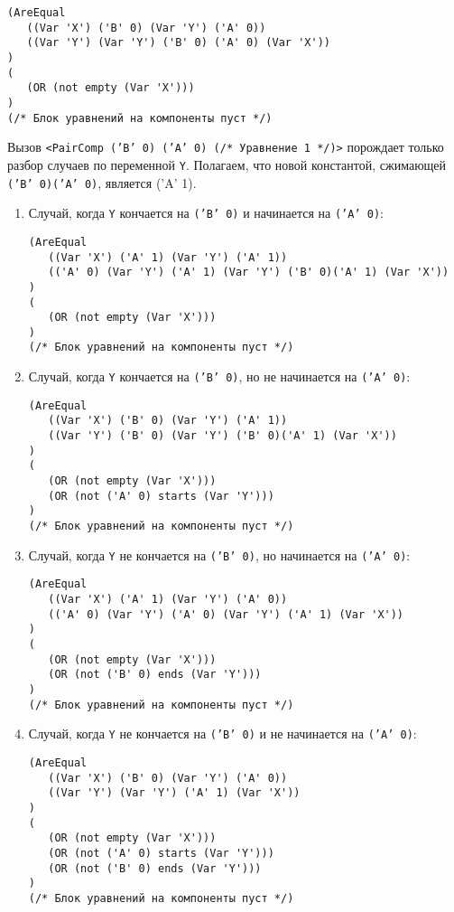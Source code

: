 \documentclass[12pt]{article}
\begin{document}
\begin{verbatim}
(AreEqual 
   ((Var 'X') ('B' 0) (Var 'Y') ('A' 0))
   ((Var 'Y') (Var 'Y') ('B' 0) ('A' 0) (Var 'X'))
)
(
   (OR (not empty (Var 'X')))
)
(/* Блок уравнений на компоненты пуст */)
\end{verbatim}
 
Вызов \texttt{<PairComp ('B' 0) ('A' 0) (/* Уравнение 1 */)>} порождает только разбор случаев по переменной \verb|Y|. Полагаем, что новой константой, сжимающей \texttt{('B' 0)('A' 0)}, является ('A' 1). 

\begin{enumerate}
\item Случай, когда \verb|Y| кончается на \texttt{('B' 0)} и начинается на \texttt{('A' 0)}:

\begin{verbatim}
(AreEqual 
   ((Var 'X') ('A' 1) (Var 'Y') ('A' 1))
   (('A' 0) (Var 'Y') ('A' 1) (Var 'Y') ('B' 0)('A' 1) (Var 'X'))
)
(
   (OR (not empty (Var 'X')))
)
(/* Блок уравнений на компоненты пуст */)
\end{verbatim}
 
\item Случай, когда \verb|Y| кончается на \texttt{('B' 0)}, но не начинается на \texttt{('A' 0)}:

\begin{verbatim}
(AreEqual 
   ((Var 'X') ('B' 0) (Var 'Y') ('A' 1))
   ((Var 'Y') ('B' 0) (Var 'Y') ('B' 0)('A' 1) (Var 'X'))
)
(
   (OR (not empty (Var 'X')))
   (OR (not ('A' 0) starts (Var 'Y')))
)
(/* Блок уравнений на компоненты пуст */)
\end{verbatim}

\item Случай, когда \verb|Y| не кончается на \texttt{('B' 0)}, но начинается на \texttt{('A' 0)}:

\begin{verbatim}
(AreEqual 
   ((Var 'X') ('A' 1) (Var 'Y') ('A' 0))
   (('A' 0) (Var 'Y') ('A' 0) (Var 'Y') ('A' 1) (Var 'X'))
)
(
   (OR (not empty (Var 'X')))
   (OR (not ('B' 0) ends (Var 'Y')))
)
(/* Блок уравнений на компоненты пуст */)
\end{verbatim}

\item Случай, когда \verb|Y| не кончается на \texttt{('B' 0)} и не начинается на \texttt{('A' 0)}:

\begin{verbatim}
(AreEqual 
   ((Var 'X') ('B' 0) (Var 'Y') ('A' 0))
   ((Var 'Y') (Var 'Y') ('A' 1) (Var 'X'))
)
(
   (OR (not empty (Var 'X')))
   (OR (not ('A' 0) starts (Var 'Y')))
   (OR (not ('B' 0) ends (Var 'Y')))
)
(/* Блок уравнений на компоненты пуст */)
\end{verbatim}


\end{enumerate}
\end{document}
